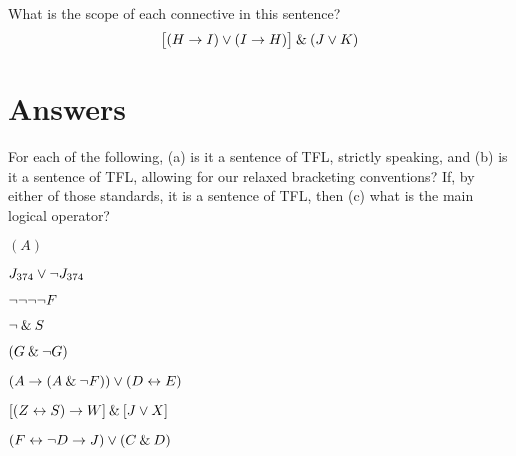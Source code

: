 
\problempart
What is the scope of each connective in this sentence?
$$\bigl[(H \rightarrow I) \vee (I \rightarrow H)\bigr] \mathbin{\&} (J \vee K)$$



\section{Answers}
\setcounter{ProbPart}{0}

\problempart
\label{pr.wiffTFL}
For each of the following, (a) is it a sentence of TFL, strictly speaking, and (b) is it a sentence of TFL, allowing for our relaxed bracketing conventions? If, by either of those standards, it is a sentence of TFL, then (c) what is the main logical operator?
\begin{earg}
\item $(A)$\hfill {}
\medskip

\item $J_{374} \vee {\neg} J_{374}$ \hfill {}
\medskip

\item ${\neg} {\neg} {\neg} {\neg} F$ \hfill {}
\medskip

\item ${\neg} \mathbin{\&} S$\hfill {}
\medskip

\item $(G \mathbin{\&} {\neg} G)$\hfill {}
\medskip

\item $(A \rightarrow (A \mathbin{\&} {\neg} F)) \vee (D \leftrightarrow E)$\hfill {}
\medskip

\item $[(Z \leftrightarrow S) \rightarrow W] \mathbin{\&} [J \vee X]$\hfill {}
\medskip

\item $(F \leftrightarrow {\neg} D \rightarrow J) \vee (C \mathbin{\&} D)$\hfill {}
\medskip
\end{earg}



